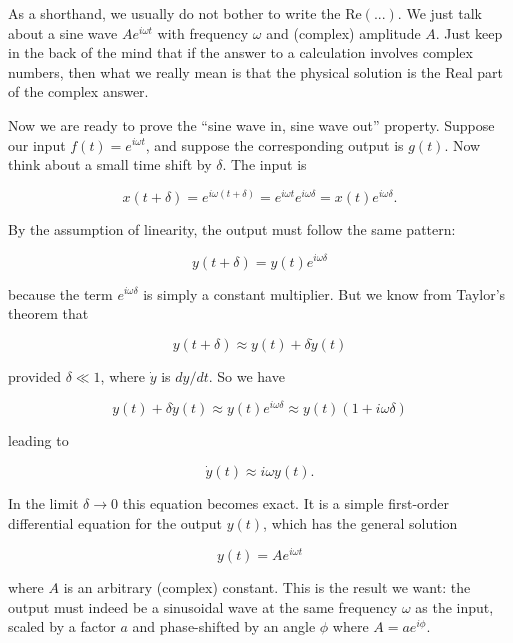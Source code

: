   As a shorthand, we usually do not bother to write the $\mathrm{Re}(...)$. We 
  just talk about a sine wave $Ae^{i \omega t}$ with frequency $\omega$ and 
  (complex) amplitude $A$. Just keep in the back of the mind that if the answer 
  to a calculation involves complex numbers, then what we really mean is that 
  the physical solution is the Real part of the complex answer. 

  Now we are ready to prove the ``sine wave in, sine wave out'' property. 
  Suppose our input $f(t)=e^{i \omega t}$, and suppose the corresponding output 
  is $g(t)$. Now think about a small time shift by $\delta$. The input is 

  $$x(t+\delta)=e^{i \omega (t+\delta)} = e^{i \omega t} e^{i \omega \delta} = 
  x(t) e^{i \omega \delta}. \tag{4}$$ 

  By the assumption of linearity, the output must follow the same pattern: 

  $$y(t+\delta)=y(t) e^{i \omega \delta} \tag{5}$$ 

  because the term $e^{i \omega \delta}$ is simply a constant multiplier. But 
  we know from Taylor's theorem that 

  $$y(t+\delta) \approx y(t) + \delta \dot{y}(t) \tag{6}$$ 

  provided $\delta \ll 1$, where $\dot{y}$ is $dy/dt$. So we have 

  $$y(t) + \delta \dot{y}(t) \approx y(t) e^{i \omega \delta} \approx y(t) (1 + 
  i \omega \delta) \tag{7}$$ 

  leading to 

  $$\dot{y}(t) \approx i \omega y(t). \tag{8}$$ 

  In the limit $\delta \rightarrow 0$ this equation becomes exact. It is a 
  simple first-order differential equation for the output $y(t)$, which has the 
  general solution 

  $$y(t) = A e^{i \omega t} \tag{9}$$ 

  where $A$ is an arbitrary (complex) constant. This is the result we want: the 
  output must indeed be a sinusoidal wave at the same frequency $\omega$ as the 
  input, scaled by a factor $a$ and phase-shifted by an angle $\phi$ where $A=a 
  e^{i \phi}$. 